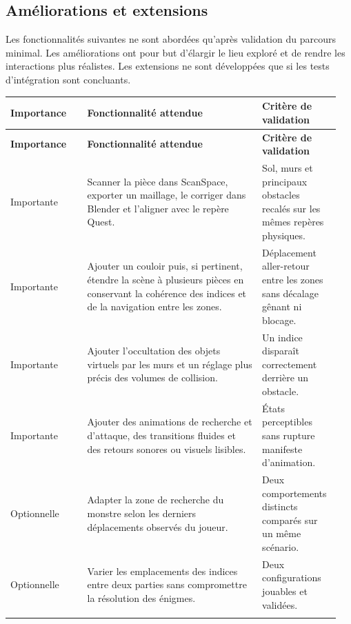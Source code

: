 \documentclass[11pt,a4paper]{article}
\newcommand{\important}{\textcolor{priorityMedium}{Importante}}
\newcommand{\optional}{\textcolor{priorityLow}{Optionnelle}}
\renewcommand{\arraystretch}{1.36}
\begin{document}
\clearpage
\subsection{Améliorations et extensions}

Les fonctionnalités suivantes ne sont abordées qu'après validation du parcours minimal. Les améliorations ont pour but d'élargir le lieu exploré et de rendre les interactions plus réalistes. Les extensions ne sont développées que si les tests d'intégration sont concluants.

{\small
\setlength{\LTpre}{1.1em}
\setlength{\LTpost}{0.9em}
\renewcommand{\arraystretch}{1.44}
\begin{longtable}{@{}L{0.222\linewidth}L{0.50\linewidth}L{0.224\linewidth}@{}}
\toprule
\textbf{Importance} & \textbf{Fonctionnalité attendue} & \textbf{Critère de validation} \\
\midrule
\endfirsthead
\toprule
\textbf{Importance} & \textbf{Fonctionnalité attendue} & \textbf{Critère de validation} \\
\midrule
\endhead
\important & Scanner la pièce dans ScanSpace, exporter un maillage, le corriger dans Blender et l'aligner avec le repère Quest. & Sol, murs et principaux obstacles recalés sur les mêmes repères physiques. \\
\addlinespace[0.25em]
\important & Ajouter un couloir puis, si pertinent, étendre la scène à plusieurs pièces en conservant la cohérence des indices et de la navigation entre les zones. & Déplacement aller-retour entre les zones sans décalage gênant ni blocage. \\
\addlinespace[0.25em]
\important & Ajouter l'occultation des objets virtuels par les murs et un réglage plus précis des volumes de collision. & Un indice disparaît correctement derrière un obstacle. \\
\addlinespace[0.25em]
\important & Ajouter des animations de recherche et d'attaque, des transitions fluides et des retours sonores ou visuels lisibles. & États perceptibles sans rupture manifeste d'animation. \\
\midrule
\optional & Adapter la zone de recherche du monstre selon les derniers déplacements observés du joueur. & Deux comportements distincts comparés sur un même scénario. \\
\addlinespace[0.25em]
\optional & Varier les emplacements des indices entre deux parties sans compromettre la résolution des énigmes. & Deux configurations jouables et validées. \\
\addlinespace[0.25em]

\end{longtable}}
\end{document}
